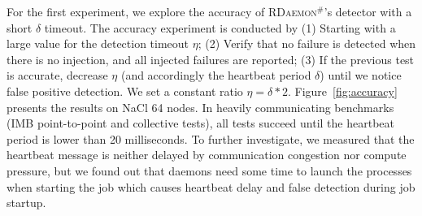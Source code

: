 \documentclass[sigconf]{acmart}
\newcommand{\ourwork}[0]{\textsc{RDaemon}\ensuremath{^\#}\xspace}
\newcommand{\imb}[0]{\textsc{IMB}\xspace}
\begin{document}
For the first experiment, we explore the accuracy of \ourwork's detector with a short $\delta$ timeout.
%
The accuracy experiment is conducted by (1) Starting with a large value for the
detection timeout $\eta$; (2) Verify that no failure is detected when there is no injection, and all injected failures are reported; (3) If the previous test is accurate, decrease $\eta$ (and accordingly the heartbeat period $\delta$) until we notice false positive detection. We set a constant ratio $\eta = \delta * 2$.
 Figure~\ref{fig:accuracy} presents the results on NaCl 64 nodes.
 In heavily communicating benchmarks
 (\imb point-to-point and collective tests), all tests succeed until the
  heartbeat period is lower than 20 milliseconds. To further investigate,
  we measured that the heartbeat message is neither delayed by communication
  congestion nor compute pressure, but we found out that daemons need some time to launch the processes when starting the job which causes heartbeat delay and false detection during job startup.
  

\end{document}
